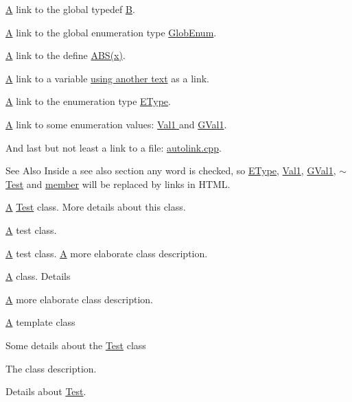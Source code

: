 \hyperlink{classA}{A} link to the global typedef \hyperlink{classB}{B}.

\hyperlink{classA}{A} link to the global enumeration type \hyperlink{autolink_8cpp_a656d63cf384d2a6f23c2c18523a7bc5e}{Glob\-Enum}.

\hyperlink{classA}{A} link to the define \hyperlink{define_8h_a996f7be338ccb40d1a2a5abc1ad61759}{A\-B\-S(x)}.

\hyperlink{classA}{A} link to a variable \hyperlink{classTest_ae75d55c8cf6390227d51c0965a4de296}{using another text} as a link.

\hyperlink{classA}{A} link to the enumeration type \hyperlink{classTest_a0653c5125502203305b6fe839e99ed01}{E\-Type}.

\hyperlink{classA}{A} link to some enumeration values\-: \hyperlink{classTest_ad8d13fe56b896633273087859b89a1a3af621232782128e49458adf9069e126d4}{Val1 } and \hyperlink{autolink_8cpp_a656d63cf384d2a6f23c2c18523a7bc5ea0f016f49e4f3bcd072319b9d68bc927d}{G\-Val1}.

And last but not least a link to a file\-: \hyperlink{autolink_8cpp}{autolink.\-cpp}.

\begin{DoxySeeAlso}{See Also}
Inside a see also section any word is checked, so \hyperlink{classTest_a0653c5125502203305b6fe839e99ed01}{E\-Type}, \hyperlink{classTest_ad8d13fe56b896633273087859b89a1a3af621232782128e49458adf9069e126d4}{Val1}, \hyperlink{autolink_8cpp_a656d63cf384d2a6f23c2c18523a7bc5ea0f016f49e4f3bcd072319b9d68bc927d}{G\-Val1}, \hyperlink{classTest_a31b169208ad4fc5344a7b6b8e1fd00c1}{$\sim$\-Test} and \hyperlink{classTest_a703997077e40c222687a0ea2973a9ea1}{member} will be replaced by links in H\-T\-M\-L.
\end{DoxySeeAlso}
\hyperlink{classA}{A} \hyperlink{classTest}{Test} class. More details about this class.

\hyperlink{classA}{A} test class.

\hyperlink{classA}{A} test class. \hyperlink{classA}{A} more elaborate class description.

\hyperlink{classA}{A} class. Details

\hyperlink{classA}{A} more elaborate class description.

\hyperlink{classA}{A} template class

Some details about the \hyperlink{classTest}{Test} class

The class description.

Details about \hyperlink{classTest}{Test}.

